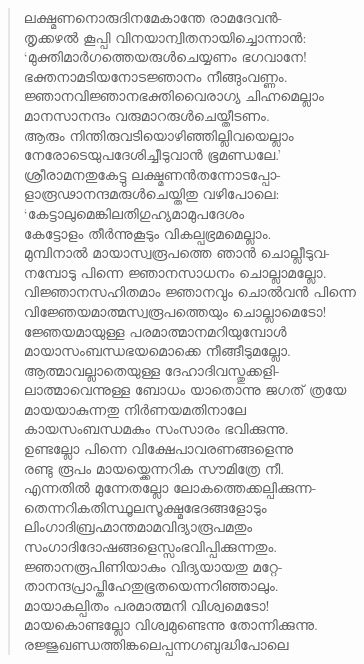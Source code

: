 \begin{verse}
ലക്ഷ്മണനൊരുദിനമേകാന്തേ രാമദേവന്‍-\\
തൃക്കഴല്‍ കൂപ്പി വിനയാന്വിതനായിച്ചൊന്നാന്‍:\\
‘മുക്തിമാര്‍ഗത്തെയരുള്‍ചെയ്യണം ഭഗവാനേ!\\
ഭക്തനാമടിയനോടജ്ഞാനം നീങ്ങുംവണ്ണം.\\
ജ്ഞാനവിജ്ഞാനഭക്തിവൈരാഗ്യ ചിഹ്നമെല്ലാം\\
മാനസാനന്ദം വരുമാറരുള്‍ചെയ്തീടണം.\\
ആരും നിന്തിരുവടിയൊഴിഞ്ഞില്ലിവയെല്ലാം\\
നേരോടെയുപദേശിച്ചീടുവാന്‍ ഭൂമണ്ഡലേ.’\\
ശ്രീരാമനതുകേട്ടു ലക്ഷ്മണന്‍തന്നോടപ്പോ-\\
ളാരൂഢാനന്ദമരുള്‍ചെയ്തിതു വഴിപോലെ:\\
‘കേട്ടാലുമെങ്കിലതിഗുഹ്യമാമുപദേശം\\
കേട്ടോളം തീര്‍ന്നുകൂടും വികല്പഭ്രമമെല്ലാം.\\
മുമ്പിനാല്‍ മായാസ്വരൂപത്തെ ഞാന്‍ ചൊല്ലീടുവ-\\
നമ്പോടു പിന്നെ ജ്ഞാനസാധനം ചൊല്ലാമല്ലോ.\\
വിജ്ഞാനസഹിതമാം ജ്ഞാനവും ചൊല്‍വന്‍ പിന്നെ\\
വിജ്ഞേയമാത്മസ്വരൂപത്തെയും ചൊല്ലാമെടോ!\\
ജ്ഞേയമായുള്ള പരമാത്മാനമറിയുമ്പോള്‍\\
മായാസംബന്ധഭയമൊക്കെ നീങ്ങീടുമല്ലോ.\\
ആത്മാവല്ലാതെയുള്ള ദേഹാദിവസ്തുക്കളി-\\
ലാത്മാവെന്നുള്ള ബോധം യാതൊന്നു ജഗത് ത്രയേ\\
മായയാകുന്നതു നിര്‍ണയമതിനാലേ\\
കായസംബന്ധമകും സംസാരം ഭവിക്കുന്നു.\\
ഉണ്ടല്ലോ പിന്നെ വിക്ഷേപാവരണങ്ങളെന്നു\\
രണ്ടു രൂപം മായയ്ക്കെന്നറിക സൗമിത്രേ നീ.\\
എന്നതില്‍ മുന്നേതല്ലോ ലോകത്തെക്കല്പിക്കുന്ന-\\
തെന്നറികതിസ്ഥൂലസൂക്ഷ്മഭേദങ്ങളോടും\\
ലിംഗാദിബ്രഹ്മാന്തമാമവിദ്യാരൂപമതും\\
സംഗാദിദോഷങ്ങളെസ്സംഭവിപ്പിക്കുന്നതും.\\
ജ്ഞാനരൂപിണിയാകും വിദ്യയായതു മറ്റേ-\\
താനന്ദപ്രാപ്തിഹേതുഭൂതയെന്നറിഞ്ഞാലും.\\
മായാകല്പിതം പരമാത്മനി വിശ്വമെടോ!\\
മായകൊണ്ടല്ലോ വിശ്വമുണ്ടെന്നു തോന്നിക്കുന്നു.\\
രജ്ജുഖണ്ഡത്തിങ്കലെപ്പന്നഗബുദ്ധിപോലെ\\

\end{verse}
